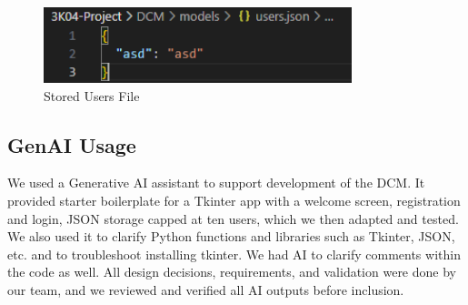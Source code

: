\documentclass{article}
\begin{document}
\begin{tcolorbox}
    \begin{figure}[H]\label{saveduser}
        \centering
        \includegraphics[width=0.8\textwidth]{saveduser.png}
        \caption{Stored Users File}
    \end{figure}
\end{tcolorbox}



\newpage
\subsection{GenAI Usage}

We used a Generative AI assistant to support development of the DCM. It provided starter boilerplate for a 
Tkinter app with a welcome screen, registration and login, JSON storage capped at ten users, which we then 
adapted and tested. We also used it to clarify Python functions and libraries such as Tkinter, JSON, etc. 
and to troubleshoot installing tkinter. We had AI to clarify comments within the code as well. All design 
decisions, requirements, and validation were done by our team, and we reviewed and verified all AI outputs 
before inclusion. 
\end{document}
